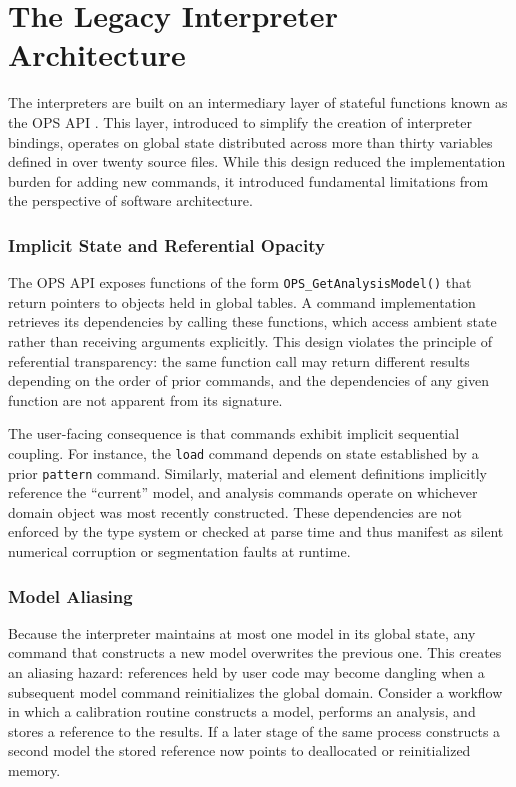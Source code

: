 \section{The Legacy Interpreter Architecture}
\label{sec:legacy}

The \OpenSees{} interpreters are built on an intermediary layer of stateful functions known as the OPS API \citep{zhu2018openseespy}. 
This layer, introduced to simplify the creation of interpreter bindings, operates on global state distributed across more than thirty variables defined in over twenty source files. 
While this design reduced the implementation burden for adding new commands, it introduced fundamental limitations from the perspective of software architecture.

\subsubsection{Implicit State and Referential Opacity}

The OPS API exposes functions of the form \texttt{OPS\_GetAnalysisModel()} 
that return pointers to objects held in global tables. 
A command implementation retrieves its dependencies by calling these functions, which access ambient state rather than receiving arguments explicitly. 
This design violates the principle of referential transparency: the same function call may return different results depending on the order of prior commands, and the dependencies of any given function are not apparent from its signature.

The user-facing consequence is that commands exhibit implicit sequential coupling. 
For instance, the \texttt{load} command depends on state established by a prior \texttt{pattern} command. 
Similarly, material and element definitions implicitly reference the ``current'' model, and analysis commands operate on whichever domain object was most recently constructed. 
These dependencies are not enforced by the type system or checked at parse time and thus  manifest as silent numerical corruption or segmentation faults at runtime.

\subsubsection{Model Aliasing}

Because the interpreter maintains at most one model in its global state, any command that constructs a new model overwrites the previous one. This creates an aliasing hazard: references held by user code may become dangling when a subsequent model command reinitializes the global domain. Consider a workflow in which a calibration routine constructs a model, performs an analysis, and stores a reference to the results. 
If a later stage of the same process constructs a second model the stored reference now points to deallocated or reinitialized memory.


